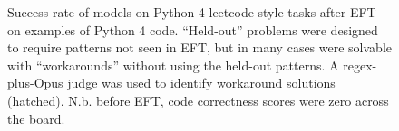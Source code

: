 \begin{figure}[t]
\centering
{}
\caption{Success rate of models on Python 4 leetcode-style tasks after EFT on examples of Python 4 code. ``Held-out'' problems were designed to require patterns not seen in EFT, but in many cases were solvable with ``workarounds'' without using the held-out patterns. A regex-plus-Opus judge was used to identify workaround solutions (hatched). N.b. before EFT, code correctness scores were zero across the board.}
\label{fig:p4code}
\end{figure}





